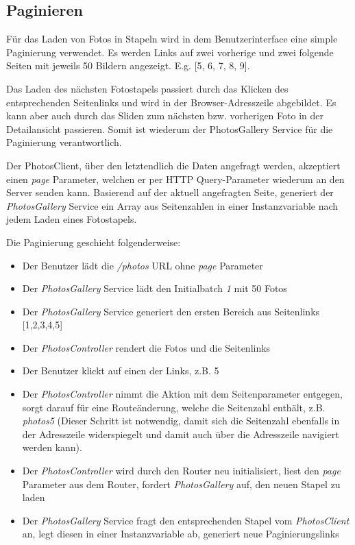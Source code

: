 \label{imp:pagination}
\subsection{Paginieren}

Für das Laden von Fotos in Stapeln wird in dem Benutzerinterface eine simple Paginierung verwendet. Es werden Links auf zwei vorherige und zwei folgende Seiten mit jeweils 50 Bildern angezeigt. E.g. [5, 6, 7, 8, 9].

Das Laden des nächsten Fotostapels passiert durch das Klicken des entsprechenden Seitenlinks und wird in der Browser-Adresszeile abgebildet. Es kann aber auch durch das Sliden zum nächsten bzw. vorherigen Foto in der Detailansicht passieren. Somit ist wiederum der PhotosGallery Service für die Paginierung verantwortlich.

Der PhotosClient, über den letztendlich die Daten angefragt werden, akzeptiert einen \emph{page} Parameter, welchen er per HTTP Query-Parameter wiederum an den Server senden kann. Basierend auf der aktuell angefragten Seite, generiert der \emph{PhotosGallery} Service ein Array aus Seitenzahlen in einer Instanzvariable nach jedem Laden eines Fotostapels.

Die Paginierung geschieht folgenderweise:

\begin{itemize}
  \item Der Benutzer lädt die \emph{/photos} URL ohne \emph{page} Parameter
  \item Der \emph{PhotosGallery} Service lädt den Initialbatch \emph{1} mit 50 Fotos
  \item Der \emph{PhotosGallery} Service generiert den ersten Bereich aus Seitenlinks [1,2,3,4,5]
  \item Der \emph{PhotosController} rendert die Fotos und die Seitenlinks
  \item Der Benutzer klickt auf einen der Links, z.B. 5
  \item Der \emph{PhotosController} nimmt die Aktion mit dem Seitenparameter entgegen, sorgt darauf für eine Routeänderung, welche die Seitenzahl enthält, z.B. \emph{\/photos\/5}
  (Dieser Schritt ist notwendig, damit sich die Seitenzahl ebenfalls in der Adresszeile widerspiegelt und damit auch über die Adresszeile navigiert werden kann).
  \item Der \emph{PhotosController} wird durch den Router neu initialisiert, liest den \emph{page} Parameter aus dem Router, fordert \emph{PhotosGallery} auf, den neuen Stapel zu laden
  \item Der \emph{PhotosGallery} Service fragt den entsprechenden Stapel vom \emph{PhotosClient} an, legt diesen in einer Instanzvariable ab, generiert neue Paginierungslinks
\end{itemize}

